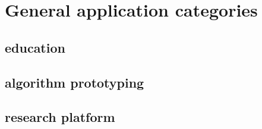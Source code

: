 \section{General application categories}
\label{sect:gen_app_cats}

\subsection{education}
\label{ssect:education}

\subsection{algorithm prototyping}
\label{ssect:algo_proto}

\subsection{research platform}
\label{ssect:research}

